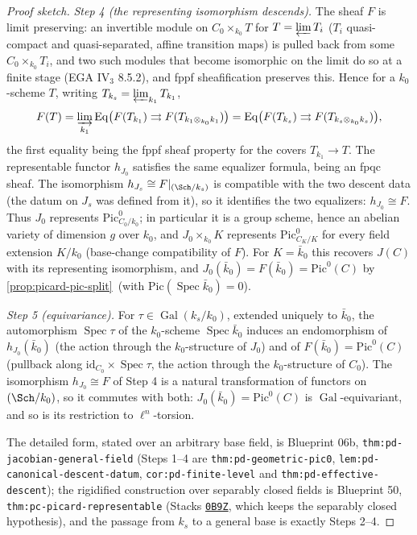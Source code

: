 \documentclass[11pt]{article}
\theoremstyle{plain}
\theoremstyle{definition}
\newcommand{\Pic}{\mathrm{Pic}}
\DeclareMathOperator{\Spec}{Spec}
\newcommand{\Cref}[1]{\hyperref[#1]{\ref{#1}}\,\hyperref[#1]{\nameref*{#1}}}
\begin{document}
\begin{proof}[Proof sketch]
\emph{Step 4 (the representing isomorphism descends).}  The sheaf $F$
is limit preserving:  an invertible module on $C_0\times_{k_0}T$ for
$T=\varprojlim T_i$ ($T_i$ quasi-compact and quasi-separated, affine
transition maps) is pulled back from some $C_0\times_{k_0}T_i$, and two
such modules that become isomorphic on the limit do so at a finite
stage (EGA IV$_3$ 8.5.2), and fppf sheafification preserves this.  Hence
for a $k_0$-scheme $T$, writing $T_{k_s}=\varprojlim_{k_1}T_{k_1}$,
\[
F(T)=\varinjlim_{k_1}\operatorname{Eq}\bigl(F(T_{k_1})\rightrightarrows
F(T_{k_1\otimes_{k_0}k_1})\bigr)
=\operatorname{Eq}\bigl(F(T_{k_s})\rightrightarrows
F(T_{k_s\otimes_{k_0}k_s})\bigr),
\]
the first equality being the fppf sheaf property for the covers
$T_{k_1}\to T$.  The representable functor $h_{J_0}$ satisfies the same
equalizer formula, being an fpqc sheaf.  The isomorphism
$h_{J_s}\cong F|_{(\Sch/k_s)}$ is compatible with the two descent data
(the datum on $J_s$ was defined from it), so it identifies the two
equalizers:  $h_{J_0}\cong F$.  Thus $J_0$ represents $\Pic^0_{C_0/k_0}$;
in particular it is a group scheme, hence an abelian variety of
dimension $g$ over $k_0$, and $J_0\times_{k_0}K$ represents
$\Pic^0_{C_K/K}$ for every field extension $K/k_0$ (base-change
compatibility of $F$).  For $K=\bar k_0$ this recovers $J(C)$ with its
representing isomorphism, and
$J_0(\bar k_0)=F(\bar k_0)=\Pic^0(C)$ by \Cref{prop:picard-pic-split}
(with $\Pic(\Spec\bar k_0)=0$).

\emph{Step 5 (equivariance).}  For
$\tau\in\operatorname{Gal}(k_s/k_0)$, extended uniquely to $\bar k_0$,
the automorphism $\Spec\tau$ of the $k_0$-scheme $\Spec\bar k_0$ induces
an endomorphism of $h_{J_0}(\bar k_0)$ (the action through the
$k_0$-structure of $J_0$) and of $F(\bar k_0)=\Pic^0(C)$ (pullback along
$\mathrm{id}_{C_0}\times\Spec\tau$, the action through the $k_0$-structure of
$C_0$).  The isomorphism $h_{J_0}\cong F$ of Step 4 is a natural
transformation of functors on $(\Sch/k_0)$, so it commutes with both:
$J_0(\bar k_0)=\Pic^0(C)$ is $\operatorname{Gal}$-equivariant, and so is
its restriction to $\ell^n$-torsion.

The detailed form, stated over an arbitrary base field, is Blueprint 06b,
\texttt{thm:pd-jacobian-general-field} (Steps 1--4 are
\texttt{thm:pd-geometric-pic0}, \texttt{lem:pd-canonical-descent-datum},
\texttt{cor:pd-finite-level} and \texttt{thm:pd-effective-descent});
the rigidified construction over separably closed fields is Blueprint
50, \texttt{thm:pc-picard-representable} (Stacks
\href{https://stacks.math.columbia.edu/tag/0B9Z}{\texttt{0B9Z}}, which
keeps the separably closed hypothesis), and the passage from $k_s$ to a
general base is exactly Steps 2--4.
\end{proof}
\end{document}
